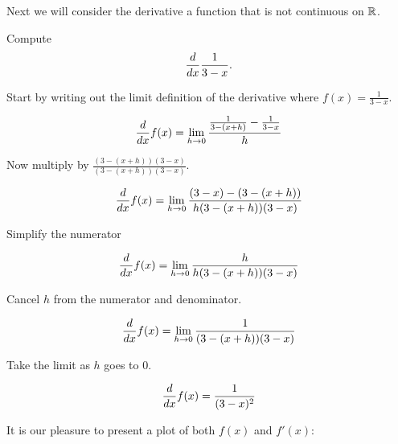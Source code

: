 \documentclass{ximera}
\begin{document}
Next we will consider the derivative a function that is not continuous
on $\mathbb R$.


\begin{example}
Compute
\[
\frac{d}{dx} \frac{1}{3-x}.
\]

Start by writing out the limit definition of the derivative where
$f(x) = \frac{1}{3-x}$.
\begin{freeResponse}[given]
\[
\frac{d}{dx} f(x) = \lim_{h\to 0}\frac{\frac{1}{3-(x+h)} - \frac{1}{3-x}}{h}
\]
\end{freeResponse}
Now multiply by $\frac{(3-(x+h))(3-x)}{(3-(x+h))(3-x)}$.
\begin{freeResponse}[given]
\[
\frac{d}{dx} f(x) = \lim_{h\to 0}\frac{(3-x) - (3-(x+h))}{h(3-(x+h))(3-x)}
\]
\end{freeResponse}
Simplify the numerator
\begin{freeResponse}[given]
\[
\frac{d}{dx} f(x) = \lim_{h\to 0}\frac{h}{h(3-(x+h))(3-x)}
\]
\end{freeResponse}
Cancel $h$ from the numerator and denominator.
\begin{freeResponse}[given]
\[
\frac{d}{dx} f(x) = \lim_{h\to 0}\frac{1}{(3-(x+h))(3-x)}
\]
\end{freeResponse}
Take the limit as $h$ goes to $0$. 
\begin{freeResponse}[given]
\[
\frac{d}{dx} f(x) = \frac{1}{(3-x)^2}
\]
\end{freeResponse}
It is our pleasure to present a plot of both $f(x)$ and $f'(x)$:
\begin{image}
\end{image}
\end{example}
\end{document}
